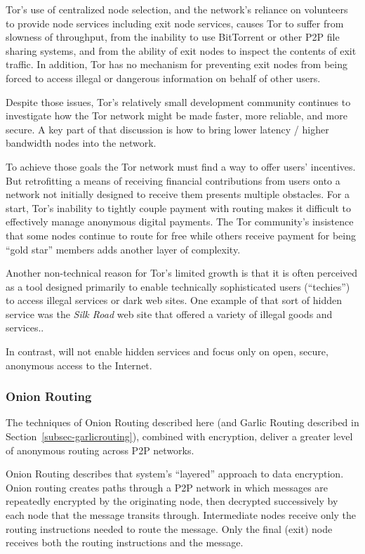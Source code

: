 Tor's use of centralized node selection, and the network's reliance on volunteers to provide node services including exit node services, causes Tor to suffer from slowness of throughput, from the inability to use BitTorrent or other P2P file sharing systems, and from the ability of exit nodes to inspect the contents of exit traffic. In addition, Tor has no mechanism for preventing exit nodes from being forced to access illegal or dangerous information on behalf of other users.

Despite those issues, Tor's relatively small development community continues to investigate how the Tor network might be made faster, more reliable, and more secure\cite{25}. A key part of that discussion is how to bring lower latency / higher bandwidth nodes into the network\cite{20, 21, 22, 23, 24}.

To achieve those goals the Tor network must find a way to offer users' incentives. But  retrofitting a means of receiving financial contributions from users onto a network not initially designed to receive them presents multiple obstacles. For a start, Tor's inability to tightly couple payment with routing makes it difficult to effectively manage anonymous digital payments. The Tor community's insistence that some nodes continue to route for free while others receive payment for being “gold star” members adds another layer of complexity.

Another non-technical reason for Tor’s limited growth is that it is often perceived as a tool designed primarily to enable technically sophisticated users (``techies'') to access illegal services or dark web sites. One example of that sort of hidden service was the \textit{Silk Road} web site that offered a variety of illegal goods and services.\cite{18,19}.

In contrast, \orchid{} will not enable hidden services and focus only on open, secure, anonymous access to the Internet.

\subsubsection{Onion Routing}
\label{subsec-onionrouting}
The techniques of Onion Routing described here (and Garlic Routing described in Section~\ref{subsec-garlicrouting}), combined with encryption, deliver a greater level of anonymous routing across P2P networks.

Onion Routing describes that system's ``layered'' approach to data encryption. Onion routing creates paths through a P2P network in which messages are repeatedly encrypted by the originating node, then decrypted successively by each node that the message transits through. Intermediate nodes receive only the routing instructions needed to route the message. Only the final (exit) node receives both the routing instructions and the  message.

